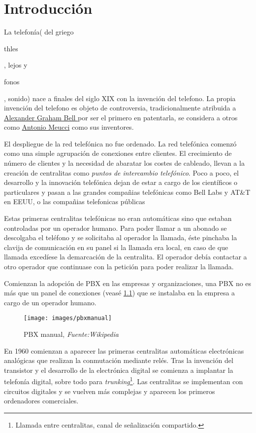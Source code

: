 
\chapter{Introducción}


La telefonía( del griego  
\begin{otherlanguage}{greek}
thles
\end{otherlanguage}, lejos y 
\begin{otherlanguage}{greek}
fonos
\end{otherlanguage}, sonido) nace a finales del siglo XIX con la invención del telefono. La propia invención del telefono es objeto de controversia, tradicionalmente atribuida a \href{http://en.wikipedia.org/wiki/Alexander_Graham_Bell}{Alexander Graham Bell }por ser el primero en patentarla, se considera a otros como \href{http://en.wikipedia.org/wiki/Antonio_Meucci}{Antonio Meucci} como sus inventores.

El despliegue de la red telefónica no fue ordenado. La red telefónica comenzó como una simple agrupación de conexiones entre clientes. El crecimiento de número de clientes y la necesidad de abaratar los costes de cableado, llevan a la creación de centralitas como \emph{puntos de intercambio telefónico}. Poco a poco, el desarrollo y la innovación telefónica dejan de estar a cargo de los científicos o particulares y pasan a las grandes compañias telefónicas como Bell Labs y AT\&T en EEUU, o las compañias telefonicas públicas

Estas primeras centralitas telefónicas no eran automáticas sino que estaban controladas por un operador humano. Para poder llamar a un abonado se descolgaba el teléfono y se solicitaba al operador la llamada, éste pinchaba la clavija de comunicación en su panel si la llamada era local, en caso de que llamada excedíese la demarcación de la centralita. El operador debía contactar a otro operador que continuase con la petición para poder realizar la llamada.

Comienzan la adopción de PBX en las empresas y organizaciones, una PBX no es más que un panel de conexiones (veasé \ref{fig:pbxmanual}) que se instalaba en la empresa a cargo de un operador humano.

\begin{figure}[!h]
  \centering
  \texttt{[image: images/pbxmanual]}
  \caption{PBX manual, \emph{Fuente:Wikipedia}}
  \label{fig:pbxmanual}
\end{figure}

En 1960 comienzan a aparecer las primeras centralitas automáticas electrónicas analógicas que realizan la conmutación mediante relés. Tras la invención del transistor y el desarrollo de la electrónica digital se comienza a implantar la telefonía digital, sobre todo para \emph{trunking}\footnote{Llamada entre centralitas, canal de señalización compartido.}. Las centralitas se implementan con circuitos digitales y se vuelven más complejas y aparecen los primeros ordenadores comerciales.

